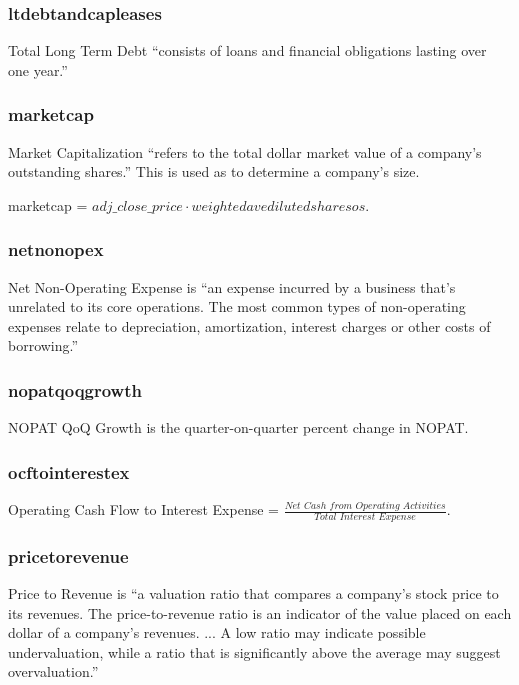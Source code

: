 \subsubsection*{ltdebtandcapleases}
Total Long Term Debt ``consists of loans and financial obligations lasting over one year.''\cite{intrinioDataTags}

\subsubsection*{marketcap}
Market Capitalization ``refers to the total dollar market value of a company's outstanding shares.'' This is used as to determine a company's size. \newline

marketcap = $adj\_close\_price \cdot weightedavedilutedsharesos$.\cite{intrinioDataTags}

\subsubsection*{netnonopex}
Net Non-Operating Expense is ``an expense incurred by a business that's unrelated to its core operations. The most common types of non-operating expenses relate to depreciation, amortization, interest charges or other costs of borrowing.''\cite{intrinioDataTags}

\subsubsection*{nopatqoqgrowth}
NOPAT QoQ Growth is the quarter-on-quarter percent change in NOPAT.

\subsubsection*{ocftointerestex}
Operating Cash Flow to Interest Expense = $\frac{Net \,\, Cash \,\, from \,\, Operating \,\, Activities}{Total \,\, Interest \,\, Expense}$.\cite{intrinioDataTags}

\subsubsection*{pricetorevenue}
Price to Revenue is ``a valuation ratio that compares a company's stock price to its revenues. The price-to-revenue ratio is an indicator of the value placed on each dollar of a company's revenues. ... A low ratio may indicate possible undervaluation, while a ratio that is significantly above the average may suggest overvaluation.''\cite{intrinioDataTags}

